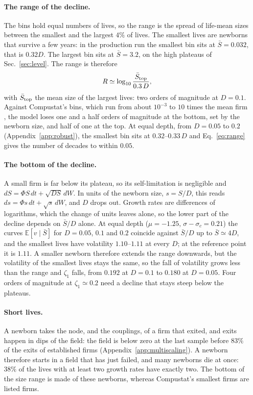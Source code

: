 \documentclass[pre,twocolumn,superscriptaddress,nofootinbib]{revtex4-2}
\newcommand{\E}{\mathbb E}
\newcommand{\Sb}{\bar S}
\begin{document}
\paragraph{The range of the decline.}  The bins hold equal numbers of lives, so the range is the spread of life-mean
sizes between the smallest and the largest $4\%$ of lives.  The smallest lives are newborns that survive a few
years: in the production run the smallest bin sits at $\Sb=0.032$, that is $0.32D$.  The largest bin sits at
$\Sb=3.2$, on the high plateaus of Sec.~\ref{sec:level}.  The range is therefore
\begin{equation}
R\simeq\log_{10}\frac{\Sb_{\rm top}}{0.3\,D},
\label{eq:range}
\end{equation}
with $\Sb_{\rm top}$ the mean size of the largest lives: two orders of magnitude at $D=0.1$.  Against Compustat's
bins, which run from about $10^{-3}$ to $10$ times the mean firm \cite{moran2024}, the model loses one and a half
orders of magnitude at the bottom, set by the newborn size, and half of one at the top.  At equal depth, from
$D=0.05$ to $0.2$ (Appendix~\ref{app:robust}), the smallest bin sits at $0.32$--$0.33\,D$ and Eq.~\eqref{eq:range} gives the number of decades to
within $0.05$.

\paragraph{The bottom of the decline.}  A small firm is far below its plateau, so its self-limitation is
negligible and $dS=\Phi S\,dt+\sqrt{DS}\,dW$.  In units of the newborn size, $s=S/D$, this reads
$ds=\Phi s\,dt+\sqrt s\,dW$, and $D$ drops out.  Growth rates are differences of logarithms, which the change of
units leaves alone, so the lower part of the decline depends on $\Sb/D$ alone.  At equal depth ($\mu=-1.25$,
$\sigma-\sigma_c=0.21$) the curves $\E[v\mid\Sb]$ for $D=0.05$, $0.1$ and $0.2$ coincide against $\Sb/D$ up to
$\Sb\simeq4D$, and the smallest lives have volatility $1.10$--$1.11$ at every $D$; at the reference point it is
$1.11$.  A smaller newborn therefore extends the range downwards, but the volatility of the smallest lives stays the
same, so the fall of volatility grows less than the range and $\zeta_1$ falls, from $0.192$ at $D=0.1$ to $0.180$ at $D=0.05$.  Four orders
of magnitude at $\zeta_1\simeq0.2$ need a decline that stays steep below the plateaus.

\paragraph{Short lives.}  A newborn takes the node, and the couplings, of a firm that exited, and exits happen in dips
of the field: the field is below zero at the last sample before $83\%$ of the exits of established firms
(Appendix~\ref{app:multiscaling}).  A newborn therefore starts in a field that has just failed, and many newborns die
at once: $38\%$ of the lives with at least two growth rates have exactly two.  The bottom of the size range is made of
these newborns, whereas Compustat's smallest firms are listed firms.
\end{document}
